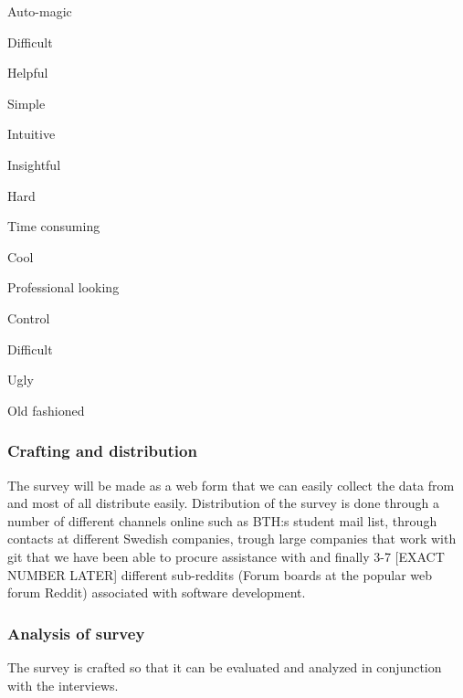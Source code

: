 \documentclass[12pt,a4paper,article,compsoc]{IEEEtran}
\begin{document}
\begin{enumerate}
				\end{enumerate}
				
				\subsubsection*{Crafting and distribution}
				The survey will be made as a web form that we can easily collect the data from and most of all distribute easily. Distribution of the survey is done through a number of different channels online such as BTH:s student mail list, through contacts at different Swedish companies, trough large companies that work with git that we have been able to procure assistance with and finally 3-7 [EXACT NUMBER LATER] different sub-reddits (Forum boards at the popular web forum Reddit) associated with software development.
				
				\subsubsection*{Analysis of survey}
				The survey is crafted so that it can be evaluated and analyzed in conjunction with the interviews. 
				
\end{document}
